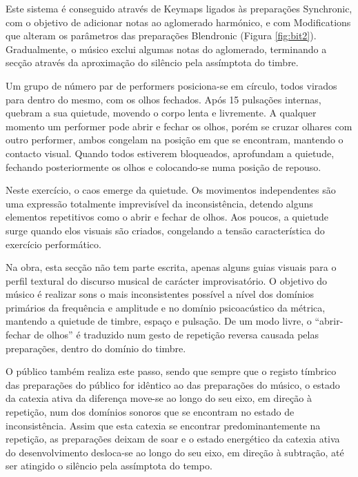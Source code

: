 \documentclass[../main.tex]{subfiles}
\begin{document}
Este sistema é conseguido através de Keymaps ligados às preparações Synchronic, com o objetivo de adicionar notas ao aglomerado harmónico, e com Modifications que alteram os parâmetros das preparações Blendronic (Figura \ref{fig:bit2}). Gradualmente, o músico exclui algumas notas do aglomerado, terminando a secção através da aproximação do silêncio pela assímptota do timbre.

\begin{performex}
    Um grupo de número par de performers posiciona-se em círculo, todos virados para dentro do mesmo, com os olhos fechados. Após 15 pulsações internas, quebram a sua quietude, movendo o corpo lenta e livremente. A qualquer momento um performer pode abrir e fechar os olhos, porém se cruzar olhares com outro performer, ambos congelam na posição em que se encontram, mantendo o contacto visual. Quando todos estiverem bloqueados, aprofundam a quietude, fechando posteriormente os olhos e colocando-se numa posição de repouso.
\end{performex}

Neste exercício, o caos emerge da quietude. Os movimentos independentes são uma expressão totalmente imprevisível da inconsistência, detendo alguns elementos repetitivos como o abrir e fechar de olhos. Aos poucos, a quietude surge quando elos visuais são criados, congelando a tensão característica do exercício performático.

Na obra, esta secção não tem parte escrita, apenas alguns guias visuais para o perfil textural do discurso musical de carácter improvisatório. O objetivo do músico é realizar sons o mais inconsistentes possível a nível dos domínios primários da frequência e amplitude e no domínio psicoacústico da métrica, mantendo a quietude de timbre, espaço e pulsação. De um modo livre, o \enquote{abrir-fechar de olhos} é traduzido num gesto de repetição reversa causada pelas preparações, dentro do domínio do timbre.

O público também realiza este passo, sendo que sempre que o registo tímbrico das preparações do público for idêntico ao das preparações do músico, o estado da catexia ativa da diferença move-se ao longo do seu eixo, em direção à repetição, num dos domínios sonoros que se encontram no estado de inconsistência. Assim que esta catexia se encontrar predominantemente na repetição, as preparações deixam de soar e o estado energético da catexia ativa do desenvolvimento desloca-se ao longo do seu eixo, em direção à subtração, até ser atingido o silêncio pela assímptota do tempo.
\end{document}

